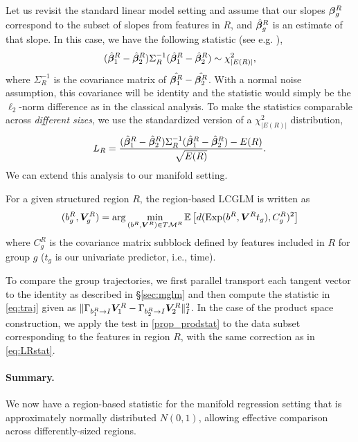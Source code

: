 Let us revisit the standard linear model setting and assume that 
our slopes $\bm{\beta}_g^R$ correspond to the subset of slopes from features in $R$, and $\hat{\bm{\beta}}_g^R$ is an estimate of that slope. In this case, we have the following  statistic (see e.g. \cite{seber2003linear}),
\begin{align}
(\hat{\bm{\beta}}_1^R - \hat{\bm{\beta}}_2^R)\Sigma_R^{-1}(\hat{\bm{\beta}}_1^R - \hat{\bm{\beta}}_2^R) \sim \chi_{|E(R)|}^2,
\end{align}
where $\Sigma_R^{-1}$ is the covariance matrix of $\hat{\bm{\beta}_1^R} - \hat{\bm{\beta}_2^R}$. With a normal noise assumption, this covariance will 
be identity and the statistic would simply be the $\ell_2$-norm difference as in the classical analysis. 
To make the statistics comparable across {\em different sizes}, we use the standardized version of a $\chi_{|E(R)|}^2$ distribution,
{\small\begin{align}\label{eq:LRstat}
L_R = \frac{(\hat{\bm{\beta}}_1^R - \hat{\bm{\beta}}_2^R)\Sigma_R^{-1}(\hat{\bm{\beta}}_1^R - \hat{\bm{\beta}}_2^R) - E(R) }{ \sqrt{E(R)} }.
\end{align}}
We can extend this analysis to our manifold setting.
\begin{definition}
For a given structured region $R$, the region-based LCGLM is written as
{ \begin{equation}
(b_g^R,\bm{V}_g^R) = \arg\min_{(b^R,\bm{V}^R) \in T\mathcal{M}^R} 
	\mathbb{E} \left[ d(\text{Exp}(b^R, \bm{V}^R t_g),C_g^R)^2\right]
\end{equation}}
where $C_g^R$ is the covariance matrix subblock defined by features included in $R$ for group $g$ ($t_g$ is our univariate predictor, i.e., time).
\end{definition}
To compare the group trajectories, we first parallel transport each tangent vector to the identity as described in \S\ref{sec:mglm} and then compute the statistic in \eqref{eq:traj} given as $\|\Gamma_{b_1^R \rightarrow I} \bm{V}_1^R - \Gamma_{b_2^R \rightarrow I} \bm{V}_2^R \|_{I}^2$.
In the case of the product space construction, we apply the test in \eqref{prop_prodstat} to the data subset corresponding to the features 
in region $R$, with the same correction as in \eqref{eq:LRstat}.

\paragraph{Summary.} We now have a region-based statistic for the manifold regression setting that is approximately normally distributed $N(0,1)$, allowing effective comparison across differently-sized regions.

